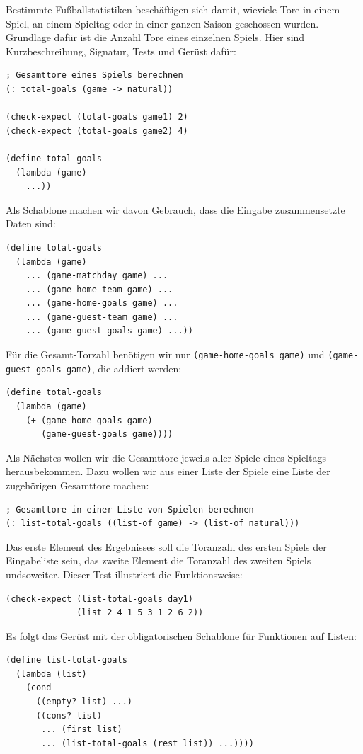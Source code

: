 Bestimmte Fußballstatistiken beschäftigen sich damit, wieviele Tore in
einem Spiel, an einem Spieltag oder in einer ganzen Saison geschossen
wurden.  Grundlage dafür ist die Anzahl Tore eines einzelnen Spiels.
Hier sind Kurzbeschreibung, Signatur, Tests und Gerüst dafür:
%
\begin{lstlisting}
; Gesamttore eines Spiels berechnen
(: total-goals (game -> natural))

(check-expect (total-goals game1) 2)
(check-expect (total-goals game2) 4)

(define total-goals
  (lambda (game)
    ...))
\end{lstlisting}
%
Als Schablone machen wir davon Gebrauch, dass die Eingabe
zusammensetzte Daten sind:
%
\begin{lstlisting}
(define total-goals
  (lambda (game)
    ... (game-matchday game) ...
    ... (game-home-team game) ...
    ... (game-home-goals game) ...
    ... (game-guest-team game) ...
    ... (game-guest-goals game) ...))
\end{lstlisting}
%
Für die Gesamt-Torzahl benötigen wir nur
\lstinline{(game-home-goals game)}
und
\lstinline{(game-guest-goals game)}, die addiert werden:
%
\begin{lstlisting}
(define total-goals
  (lambda (game)
    (+ (game-home-goals game)
       (game-guest-goals game))))
\end{lstlisting}
%
Als Nächstes wollen wir die Gesamttore jeweils aller Spiele eines
Spieltags herausbekommen.  Dazu wollen wir aus einer Liste der Spiele
eine Liste der zugehörigen Gesamttore machen:
%
\begin{lstlisting}
; Gesamttore in einer Liste von Spielen berechnen
(: list-total-goals ((list-of game) -> (list-of natural)))
\end{lstlisting}
%
Das erste Element des Ergebnisses soll die Toranzahl des ersten Spiels
der Eingabeliste sein, das zweite Element die Toranzahl des zweiten
Spiels undsoweiter.  Dieser Test illustriert die Funktionsweise:
%
\begin{lstlisting}
(check-expect (list-total-goals day1)
              (list 2 4 1 5 3 1 2 6 2))
\end{lstlisting}
%
Es folgt das Gerüst mit der obligatorischen Schablone für Funktionen
auf Listen:
%
\begin{lstlisting}
(define list-total-goals
  (lambda (list)
    (cond
      ((empty? list) ...)
      ((cons? list)
       ... (first list)
       ... (list-total-goals (rest list)) ...))))
\end{lstlisting}

